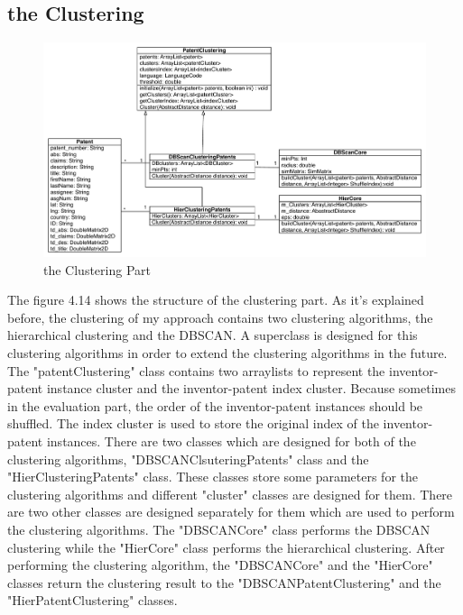 \subsection{the Clustering}
\begin{figure}
\centering
\includegraphics[width=\headwidth]{clusteringPart.pdf}
\caption{the Clustering Part}
\end{figure}
The figure 4.14 shows the structure of the clustering part. As it's explained before, the clustering of my approach contains two clustering algorithms, the hierarchical clustering and the DBSCAN. A superclass is designed for this clustering algorithms in order to extend the clustering algorithms in the future. The "patentClustering" class contains two arraylists to represent the inventor-patent instance cluster and the inventor-patent index cluster. Because sometimes in the evaluation part, the order of the inventor-patent instances should be shuffled. The index cluster is used to store the original index of the inventor-patent instances. There are two classes which are designed for both of the clustering algorithms, "DBSCANClsuteringPatents" class and the "HierClusteringPatents" class. These classes store some parameters for the clustering algorithms and different "cluster" classes are designed for them. There are two other classes are designed separately for them which are used to perform the clustering algorithms. The "DBSCANCore" class performs the DBSCAN clustering while the "HierCore" class performs the hierarchical clustering. After performing the clustering algorithm, the "DBSCANCore" and the "HierCore" classes return the clustering result  to the "DBSCANPatentClustering" and the "HierPatentClustering" classes.

